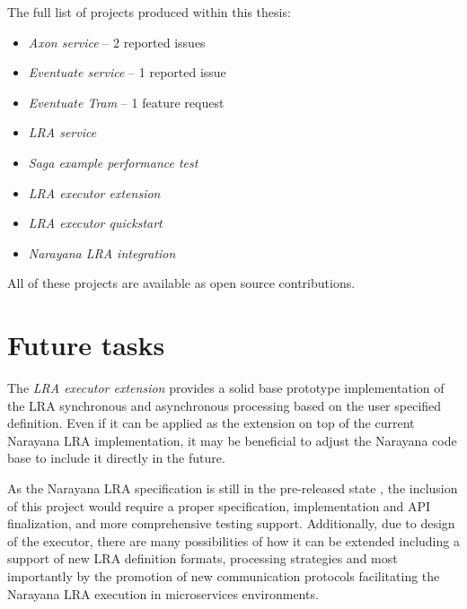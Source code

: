 \documentclass[oneside,
  digital, %
  table,   %
  lof,     %
  lot,     %
]{fithesis3}
\begin{document}
The full list of projects produced within this thesis:

\begin{itemize}
    \item \textit{Axon service} -- 2 reported issues
    
    \item \textit{Eventuate service} -- 1 reported issue
    
    \item \textit{Eventuate Tram} -- 1 feature request
    
    \item \textit{LRA service}
    
    \item \textit{Saga example performance test}
    
    \item \textit{LRA executor extension}
    
    \item \textit{LRA executor quickstart}
    
    \item \textit{Narayana LRA integration}
\end{itemize}

\noindent
All of these projects are available as open source contributions.

\section{Future tasks}

The \textit{LRA executor extension} provides a solid base prototype implementation of the LRA synchronous and asynchronous processing based on the user specified definition. Even if it can be applied as the extension on top of the current Narayana LRA implementation, it may be beneficial to adjust the Narayana code base to include it directly in the future. 

As the Narayana LRA specification is still in the pre-released state \cite{narayana_lra}, the inclusion of this project would require a proper specification, implementation and API finalization, and more comprehensive testing support. Additionally, due to design of the executor, there are many possibilities of how it can be extended including a support of new LRA definition formats, processing strategies and most importantly by the promotion of new communication protocols facilitating the Narayana LRA execution in microservices environments.

\makeatletter\thesis@blocks@clear\makeatother
{} %
\printindex
\end{document}
